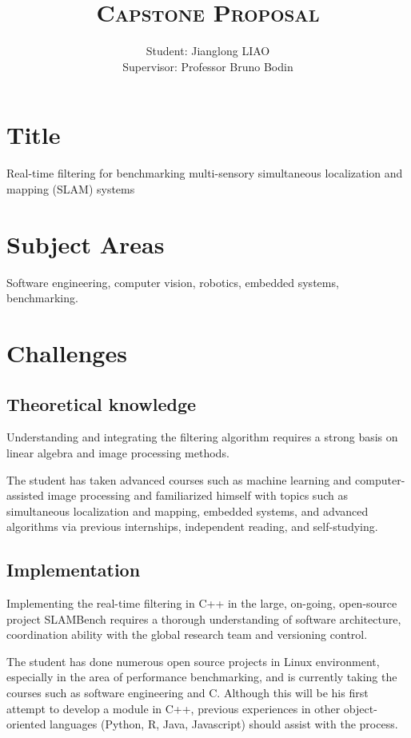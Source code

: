 \documentclass[11pt, oneside, a4paper]{article}
\author{
    Student: Jianglong LIAO\\
    Supervisor: Professor Bruno Bodin
    }
\title{\textsc{Capstone Proposal}}
\date{\vspace{-5ex}}
\begin{document}
\maketitle

\thispagestyle{fancy}


\section{Title}
Real-time filtering for benchmarking multi-sensory simultaneous localization and mapping (SLAM) systems

\section{Subject Areas}
Software engineering, computer vision, robotics, embedded systems, benchmarking.

\section{Challenges}
\subsection{Theoretical knowledge}
Understanding and integrating the filtering algorithm requires a strong basis on linear algebra and image processing methods.

The student has taken advanced courses such as machine learning and computer-assisted image processing and familiarized himself with topics such as simultaneous localization and mapping, embedded systems, and advanced algorithms via previous internships, independent reading, and self-studying.

\subsection{Implementation}
Implementing the real-time filtering in C++ in the large, on-going, open-source project SLAMBench requires a thorough understanding of software architecture, coordination ability with the global research team and versioning control.

The student has done numerous open source projects in Linux environment, especially in the area of performance benchmarking, and is currently taking the courses such as software engineering and C. Although this will be his first attempt to develop a module in C++, previous experiences in other object-oriented languages (Python, R, Java, Javascript) should assist with the process.
\end{document}
